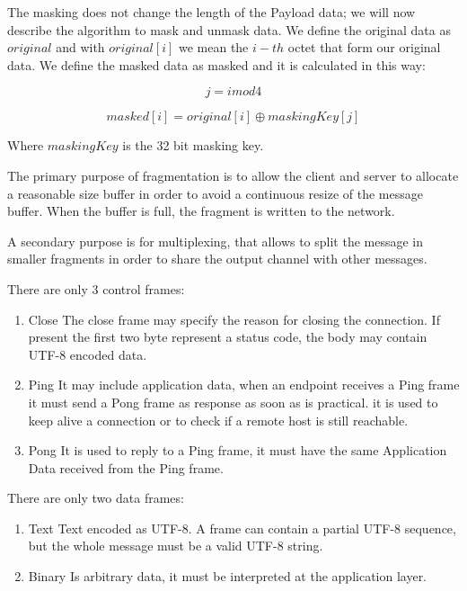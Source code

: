 
The masking does not change the length of the Payload data; we will now describe the algorithm to mask and unmask data.
We define the original data as $original$ and with $original[i]$ we mean the $i-th$ octet that form our original data.
We define the masked data as masked and it is calculated in this way:

\begin{equation}
	j=i mod 4
\end{equation}

\begin{equation}
masked[i]=original[i] \oplus maskingKey[j]
\end{equation}

Where $maskingKey$ is the 32 bit masking key.

The primary purpose of fragmentation is to allow the client and server to allocate a reasonable size buffer in order to avoid a continuous resize of the message buffer.\newline
When the buffer is full, the fragment is written to the network.\newline

A secondary purpose is for multiplexing, that allows to split the message in smaller fragments in order to share the output channel with other messages.\newline

There are only 3 control frames:
\begin{enumerate}
	\item Close The close frame may specify the reason for closing the connection.
	If present the first two byte represent a status code, the body may contain UTF-8 encoded data.
	\item Ping
	It may include application data, when an endpoint receives a Ping frame it must send a Pong frame as response as soon as is practical.
	it is used to keep alive a connection or to check if a remote host is still reachable.
	\item Pong
	It is used to reply to a Ping frame, it must have the same Application Data received from the Ping frame.
\end{enumerate}

There are only two data frames:
\begin{enumerate}
	\item Text
	Text encoded as UTF-8.
	A frame can contain a partial UTF-8 sequence, but the whole message must be a valid UTF-8 string.
	\item Binary
	Is arbitrary data, it must be interpreted at the application layer.
\end{enumerate}

